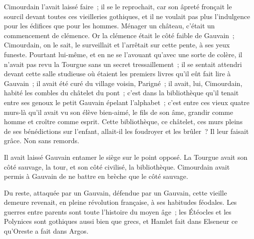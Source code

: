 \documentclass[french,twoside]{book} %
\begin{document}
Cimourdain l’avait laissé faire ; il se le reprochait, car son âpreté fronçait le sourcil devant toutes ces vieilleries gothiques, et il ne voulait pas plus l’indulgence pour les édifices que pour les hommes. Ménager un château, c’était un commencement de clémence. Or la clémence était le côté faible de Gauvain ; Cimourdain, on le sait, le surveillait et l’arrêtait sur cette pente, à ses yeux funeste. Pourtant lui-même, et en ne se l’avouant qu’avec une sorte de colère, il n’avait pas revu la Tourgue sans un secret tressaillement ;  il se sentait attendri devant cette salle studieuse où étaient les premiers livres qu’il eût fait lire à Gauvain ; il avait été curé du village voisin, Parigné ; il avait, lui, Cimourdain, habité les combles du châtelet du pont ; c’est dans la bibliothèque qu’il tenait entre ses genoux le petit Gauvain épelant l’alphabet ; c’est entre ces vieux quatre murs-là qu’il avait vu son élève bien-aimé, le fils de son âme, grandir comme homme et croître comme esprit. Cette bibliothèque, ce châtelet, ces murs pleins de ses bénédictions sur l’enfant, allait-il les foudroyer et les brûler ? Il leur faisait grâce. Non sans remords.\par
Il avait laissé Gauvain entamer le siège sur le point opposé. La Tourgue avait son côté sauvage, la tour, et son côté civilisé, la bibliothèque. Cimourdain avait permis à Gauvain de ne battre en brèche que le côté sauvage.\par
Du reste, attaquée par un Gauvain, défendue par un Gauvain, cette vieille demeure revenait, en pleine révolution française, à ses habitudes féodales. Les guerres entre parents sont toute l’histoire du moyen âge ; les Étéocles et les Polynices sont gothiques aussi bien que grecs, et Hamlet fait dans Elseneur ce qu’Oreste a fait dans Argos.
\end{document}
